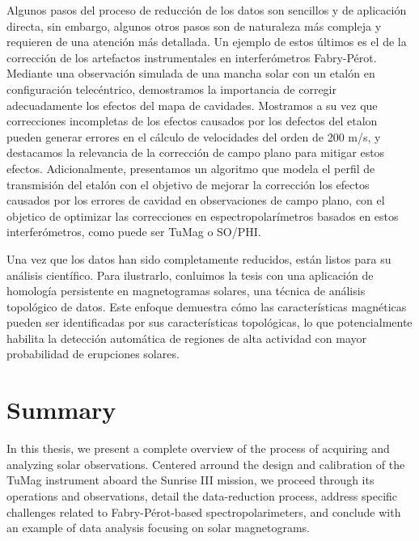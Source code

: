 \documentclass[12pt]{mythesis}
\begin{document}
Algunos pasos del proceso de reducción de los datos son sencillos y de aplicación directa, sin embargo, algunos otros pasos son de naturaleza más compleja y requieren de una atención más detallada. Un ejemplo de estos últimos es el de la corrección de los artefactos instrumentales en interferómetros Fabry-Pérot. Mediante una observación simulada de una mancha solar con un etalón en configuración telecéntrico, demostramos la importancia de corregir adecuadamente los efectos del mapa de cavidades. Mostramos a su vez que correcciones incompletas de los efectos causados por los defectos del etalon pueden generar errores en el cálculo de velocidades del orden de 200 m/s, y destacamos la relevancia de la corrección de campo plano para mitigar estos efectos. Adicionalmente, presentamos un algoritmo que modela el perfil de transmisión del etalón con el objetivo de mejorar la corrección los efectos causados por los errores de cavidad en observaciones de campo plano, con el objetico de optimizar las correcciones en espectropolarímetros basados en estos interferómetros, como puede ser TuMag o SO/PHI.

Una vez que los datos han sido completamente reducidos, están listos para su análisis científico. Para ilustrarlo, conluimos la tesis con una aplicación de homología persistente en magnetogramas solares, una técnica de análisis topológico de datos. Este enfoque demuestra cómo las características magnéticas pueden ser identificadas por sus características topológicas, lo que potencialmente habilita la detección automática de regiones de alta actividad con mayor probabilidad de erupciones solares.                   


\chapter*{Summary}

In this thesis, we present a complete overview of the process of acquiring and analyzing solar observations. Centered arround the design and calibration of the TuMag instrument aboard the Sunrise III mission, we proceed through its operations and observations, detail the data-reduction process, address specific challenges related to Fabry-Pérot-based spectropolarimeters, and conclude with an example of data analysis focusing on solar magnetograms.
\end{document}

